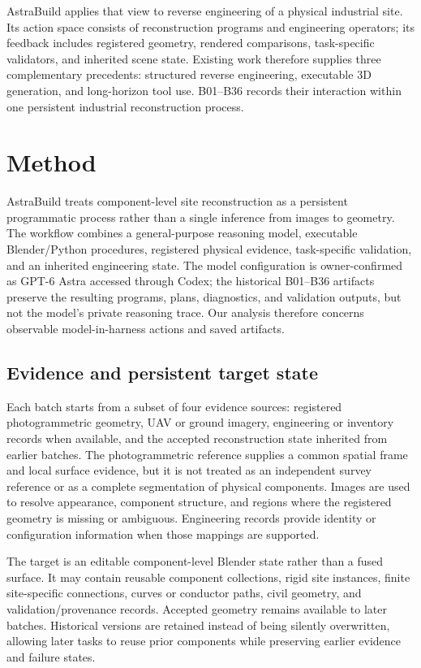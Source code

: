 \documentclass[10pt,a4paper]{article}
\begin{document}
AstraBuild applies that view to reverse engineering of a physical
industrial site. Its action space consists of reconstruction programs
and engineering operators; its feedback includes registered geometry,
rendered comparisons, task-specific validators, and inherited scene
state. Existing work therefore supplies three complementary precedents:
structured reverse engineering, executable 3D generation, and
long-horizon tool use. B01--B36 records their interaction within one
persistent industrial reconstruction process.

\hypertarget{method}{%
\section{Method}\label{method}}

AstraBuild treats component-level site reconstruction as a persistent
programmatic process rather than a single inference from images to
geometry. The workflow combines a general-purpose reasoning model,
executable Blender/Python procedures, registered physical evidence,
task-specific validation, and an inherited engineering state. The model
configuration is owner-confirmed as GPT-6 Astra accessed through Codex;
the historical B01--B36 artifacts preserve the resulting programs,
plans, diagnostics, and validation outputs, but not the model's private
reasoning trace. Our analysis therefore concerns observable
model-in-harness actions and saved artifacts.

\hypertarget{evidence-and-persistent-target-state}{%
\subsection{Evidence and persistent target
state}\label{evidence-and-persistent-target-state}}

Each batch starts from a subset of four evidence sources: registered
photogrammetric geometry, UAV or ground imagery, engineering or
inventory records when available, and the accepted reconstruction state
inherited from earlier batches. The photogrammetric reference supplies a
common spatial frame and local surface evidence, but it is not treated
as an independent survey reference or as a complete segmentation of
physical components. Images are used to resolve appearance, component
structure, and regions where the registered geometry is missing or
ambiguous. Engineering records provide identity or configuration
information when those mappings are supported.

The target is an editable component-level Blender state rather than a
fused surface. It may contain reusable component collections, rigid site
instances, finite site-specific connections, curves or conductor paths,
civil geometry, and validation/provenance records. Accepted geometry
remains available to later batches. Historical versions are retained
instead of being silently overwritten, allowing later tasks to reuse
prior components while preserving earlier evidence and failure states.
\end{document}
